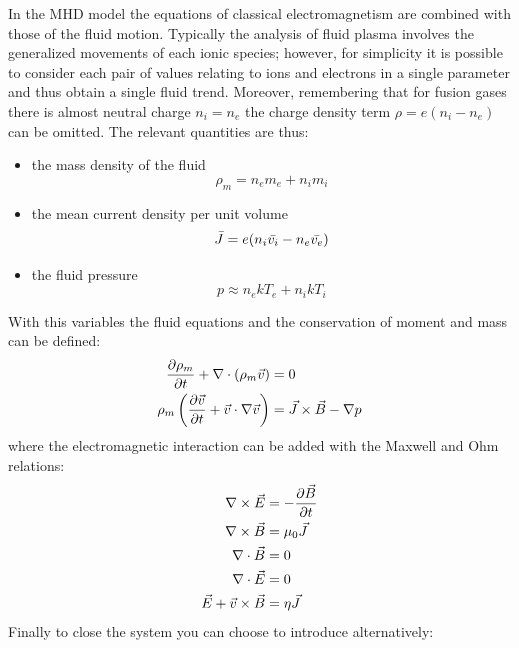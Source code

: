 In the MHD model the equations of classical electromagnetism are combined with those of the fluid motion. Typically the analysis of fluid plasma involves the generalized movements of each ionic species; however, for simplicity it is possible to consider each pair of values relating to ions and electrons in a single parameter and thus obtain a single fluid trend. Moreover, remembering that for fusion gases there is almost neutral charge $n_i = n_e$ the charge density term $\rho = e(n_i - n_e)$ can be omitted. The relevant quantities are thus:
\begin{itemize}
    \item the mass density of the fluid
    \begin{equation}
        \rho_m = n_e m_e + n_i m_i
    \end{equation}
    \item the mean current density per unit volume
    \begin{equation}
        \bar{J} = e(n_i \bar{v_i} - n_e \bar{v_e})
    \end{equation}
    \item the fluid pressure
    \begin{equation}
        p \approx n_e k T_e + n_i k T_i
    \end{equation}
\end{itemize}
With this variables the fluid equations and the conservation of moment and mass can be defined:
\begin{align}
    \pdv{\rho_m}{t} + \nabla \cdot (\rho_m \Vec{v}) &= 0 \\
    \rho_m \left( \pdv{\Vec{v}}{t} + \Vec{v} \cdot \nabla \Vec{v} \right) &= \Vec{J} \times \Vec{B} - \nabla p
 \end{align}
where the electromagnetic interaction can be added with the Maxwell and Ohm relations:
\begin{align}
    \nabla \times \Vec{E} &= - \pdv{\Vec{B}}{t} \label{eq:faraday} \\
    \nabla \times \Vec{B} &= \mu_0 \Vec{J} \label{eq:ampere} \\
    \nabla \cdot \Vec{B}  &= 0 \\
    \nabla \cdot \Vec{E}  &= 0 \\
    \Vec{E} + \Vec{v} \times \Vec{B} &= \eta \Vec{J} \label{eq:ohm}
\end{align}
Finally to close the system you can choose to introduce alternatively:
